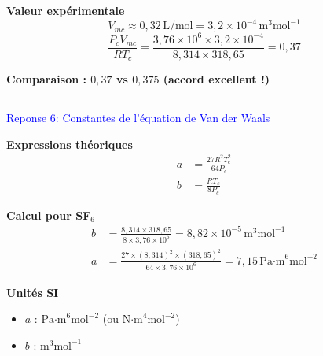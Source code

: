 		\textbf{Valeur expérimentale}
		\[
		V_{mc} \approx 0,32\,\text{L/mol} = 3,2\times10^{-4}\,\text{m}^3\text{mol}^{-1}
		\]
		\[
		\frac{P_c V_{mc}}{RT_c} = \frac{3,76\times10^6 \times 3,2\times10^{-4}}{8,314 \times 318,65} = 0,37
		\]
		
		\textbf{Comparaison : $0,37$ vs $0,375$ (accord excellent !)}
		
		
		
		
	\subsection*{}	
	\textcolor{blue}{Reponse 6:  Constantes de l'équation de Van der Waals}
		
		\textbf{Expressions théoriques}
		\begin{align}
			a &= \frac{27 R^2 T_c^2}{64 P_c} \\
			b &= \frac{R T_c}{8 P_c}
		\end{align}
		
		\textbf{Calcul pour SF$_6$}
		\begin{align}
			b &= \frac{8,314 \times 318,65}{8 \times 3,76\times10^6} = 8,82\times10^{-5} \, \text{m}^3\text{mol}^{-1} \\
			a &= \frac{27 \times (8,314)^2 \times (318,65)^2}{64 \times 3,76\times10^6} = 7,15 \, \text{Pa·m}^6\text{mol}^{-2}
		\end{align}
		
		\textbf{Unités SI}
		\begin{itemize}
			\item $a$ : $\text{Pa·m}^6\text{mol}^{-2}$ (ou $\text{N·m}^4\text{mol}^{-2}$)
			\item $b$ : $\text{m}^3\text{mol}^{-1}$
		\end{itemize}
		
		\begin{center}
		\end{center}
		
